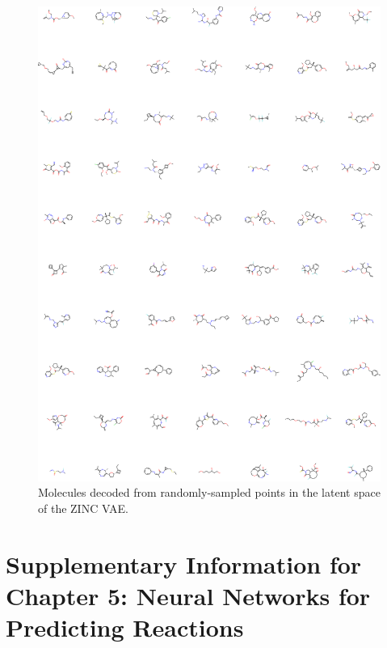 \begin{figure}[h]
\centering
\includegraphics[width=0.9\columnwidth]{./VAE_random.png}
\caption[Random molecules sampled from Variational Autoencoder]{Molecules decoded from randomly-sampled points in the latent space of the ZINC VAE.}
\label{fig:random_3}
\end{figure}


\section{Supplementary Information for Chapter 5: Neural Networks for Predicting Reactions}

